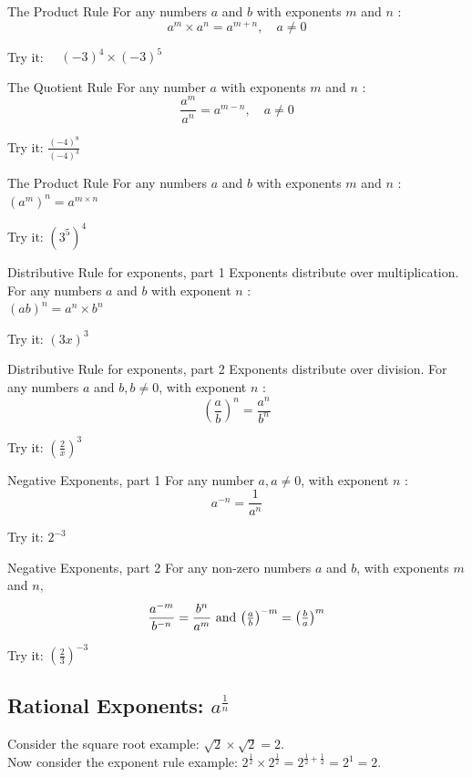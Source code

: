\documentclass[12pt,fleqn]{book}
\begin{document}
\begin{thm}{The Product Rule}{}
    For any numbers $a$ and $b$ with exponents $m$ and $n$ :
    \[
        a^{m} \times a^{n}=a^{m+n}, \quad a \neq 0
    \]
\end{thm}
Try it:
$\quad(-3)^{4} \times(-3)^{5}$
\vfill
\begin{thm}{The Quotient Rule}{}
    For any number $a$ with exponents $m$ and $n$ :
    \[
        \frac{a^{m}}{a^{n}}=a^{m-n}, \quad a \neq 0
    \]
\end{thm}
Try it: $\displaystyle \frac{(-4)^{8}}{(-4)^{3}}$
\vfill
\clearpage
\begin{thm}{The Product Rule}{}
    For any numbers $a$ and $b$ with exponents $m$ and $n$ :\\
    $\left(a^{m}\right)^{n}=a^{m \times n}$
\end{thm}
Try it:
$\left(3^{5}\right)^{4}$
\vfill
\begin{thm}{Distributive Rule for exponents, part 1}{}
    Exponents distribute over multiplication.
    For any numbers $a$ and $b$ with exponent $n$ :\\
    $(a b)^{n}=a^{n} \times b^{n}$
\end{thm}
Try it: $(3 x)^{3}$
\vfill
\begin{thm}{Distributive Rule for exponents, part 2}{}
    Exponents distribute over division.
    For any numbers $a$ and $b, b \neq 0$, with exponent $n$ :
    \[
        \left(\frac{a}{b}\right)^{n}=\frac{a^{n}}{b^{n}}
    \]
\end{thm}
Try it:
$\displaystyle \left(\frac{2}{x}\right)^{3}$
\vfill
\clearpage
\begin{thm}{Negative Exponents, part 1}{}
    For any number $a, a \neq 0$, with exponent $n$ :
    \[
        a^{-n}=\frac{1}{a^{n}}
    \]
\end{thm}
Try it: $2^{-3}$
\vfill
\begin{thm}{Negative Exponents, part 2}
    For any non-zero numbers $a$ and $b$, with exponents $m$ and $n$,
    \[
        \frac{a^{-m}}{b^{-n}}=\frac{b^{n}}{a^{m}}$ and $\left(\frac{a}{b}\right)^{-m}=\left(\frac{b}{a}\right)^{m}
    \]
\end{thm}
Try it:
$\left(\frac{2}{3}\right)^{-3}$
\vfill
\clearpage
\subsection*{Rational Exponents: $a^{\frac{1}{n}}$}
Consider the square root example: $\sqrt{2} \times \sqrt{2}=2$.\\
Now consider the exponent rule example: $2^{\frac{1}{2}} \times 2^{\frac{1}{2}}=2^{\frac{1}{2}+\frac{1}{2}}=2^{1}=2$.\\
\end{document}
